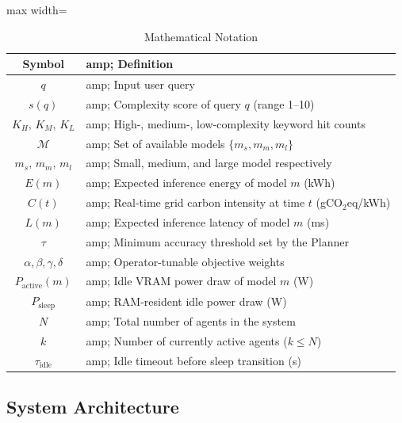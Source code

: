 \documentclass[journal]{IEEEtran}
\begin{document}
\begin{table}[!htbp]
\renewcommand{\arraystretch}{1.3}
\centering
\caption{Mathematical Notation}
\label{tab:notation}
\begin{adjustbox}{max width=\linewidth}
\begin{tabular}{@{}cl@{}}
\toprule
\textbf{Symbol} &amp; \textbf{Definition} \\
\midrule
$q$                        &amp; Input user query \\
$s(q)$                     &amp; Complexity score of query $q$ (range 1--10) \\
$K_H,\, K_M,\, K_L$        &amp; High-, medium-, low-complexity keyword hit counts \\
$\mathcal{M}$              &amp; Set of available models $\{m_s, m_m, m_l\}$ \\
$m_s,\, m_m,\, m_l$        &amp; Small, medium, and large model respectively \\
$E(m)$                     &amp; Expected inference energy of model $m$ (kWh) \\
$C(t)$                     &amp; Real-time grid carbon intensity at time $t$ (gCO$_2$eq/kWh) \\
$L(m)$                     &amp; Expected inference latency of model $m$ (ms) \\
$\tau$                     &amp; Minimum accuracy threshold set by the Planner \\
$\alpha,\beta,\gamma,\delta$ &amp; Operator-tunable objective weights \\
$P_{\text{active}}(m)$     &amp; Idle VRAM power draw of model $m$ (W) \\
$P_{\text{sleep}}$         &amp; RAM-resident idle power draw (W) \\
$N$                        &amp; Total number of agents in the system \\
$k$                        &amp; Number of currently active agents ($k \leq N$) \\
$\tau_{\text{idle}}$       &amp; Idle timeout before sleep transition (s) \\
\bottomrule
\end{tabular}\end{adjustbox}
\end{table}

\subsection{System Architecture}
\end{document}
